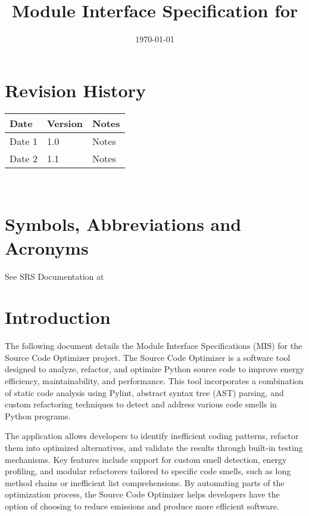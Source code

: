 \documentclass[12pt, titlepage]{article}
\begin{document}
\title{Module Interface Specification for \progname{}}

\author{\authname}

\date{\today}

\maketitle


\section{Revision History}

\begin{tabularx}{\textwidth}{p{3cm}p{2cm}X}
\toprule {\bf Date} & {\bf Version} & {\bf Notes}\\
\midrule
Date 1 & 1.0 & Notes\\
Date 2 & 1.1 & Notes\\
\bottomrule
\end{tabularx}

~\newpage

\section{Symbols, Abbreviations and Acronyms}

See SRS Documentation at 


\newpage

\tableofcontents

\newpage


\section{Introduction}

The following document details the Module Interface Specifications (MIS) for the Source Code Optimizer project. The Source Code Optimizer is a software tool designed to analyze, refactor, and optimize Python source code to improve energy efficiency, maintainability, and performance. This tool incorporates a combination of static code analysis using Pylint, abstract syntax tree (AST) parsing, and custom refactoring techniques to detect and address various code smells in Python programs.

The application allows developers to identify inefficient coding patterns, refactor them into optimized alternatives, and validate the results through built-in testing mechanisms. Key features include support for custom smell detection, energy profiling, and modular refactorers tailored to specific code smells, such as long method chains or inefficient list comprehensions. By automating parts of the optimization process, the Source Code Optimizer helps developers have the option of choosing to reduce emissions and produce more efficient software.
\end{document}
